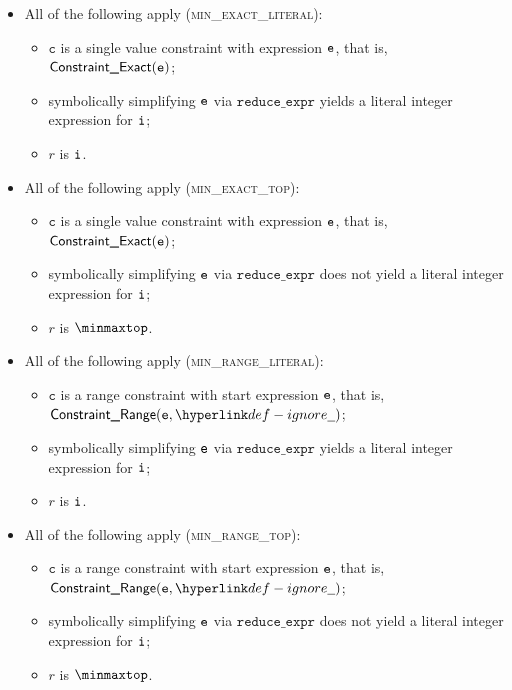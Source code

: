 \documentclass{book}
\newcommand\reduceexpr[0]{\texttt{reduce\_expr}}
\newcommand\vc[0]{\texttt{c}}
\begin{document}
\begin{itemize}
  \item All of the following apply (\textsc{min\_exact\_literal}):
  \begin{itemize}
    \item $\vc$ is a single value constraint with expression $\texttt{e}$, that is, $\textsf{Constraint\_Exact}(\texttt{e})$;
    \item symbolically simplifying $\texttt{e}$ via $\reduceexpr$ yields a literal integer expression for $\texttt{i}$;
    \item $r$ is $\texttt{i}$.
  \end{itemize}

  \item All of the following apply (\textsc{min\_exact\_top}):
  \begin{itemize}
    \item $\vc$ is a single value constraint with expression $\texttt{e}$, that is, $\textsf{Constraint\_Exact}(\texttt{e})$;
    \item symbolically simplifying $\texttt{e}$ via $\reduceexpr$ does not yield a literal integer expression for $\texttt{i}$;
    \item $r$ is $\minmaxtop$.
  \end{itemize}

  \item All of the following apply (\textsc{min\_range\_literal}):
  \begin{itemize}
    \item $\vc$ is a range constraint with start expression $\texttt{e}$, that is, $\ConstraintRange(\ve, \Ignore)$;
    \item symbolically simplifying $\texttt{e}$ via $\reduceexpr$ yields a literal integer expression for $\texttt{i}$;
    \item $r$ is $\texttt{i}$.
  \end{itemize}

  \item All of the following apply (\textsc{min\_range\_top}):
  \begin{itemize}
    \item $\vc$ is a range constraint with start expression $\texttt{e}$, that is, $\ConstraintRange(\ve, \Ignore)$;
    \item symbolically simplifying $\texttt{e}$ via $\reduceexpr$ does not yield a literal integer expression for $\texttt{i}$;
    \item $r$ is $\minmaxtop$.
  \end{itemize}
\end{itemize}
\end{document}
